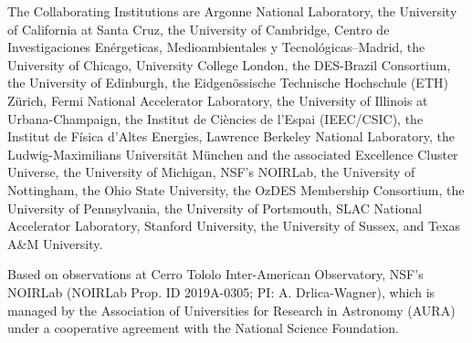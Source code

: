 \documentclass[twocolumn,trackchanges]{aastex63}
\begin{document}
The Collaborating Institutions are Argonne National Laboratory, the University of California at Santa Cruz, the University of Cambridge, Centro de Investigaciones Enérgeticas, Medioambientales y Tecnológicas–Madrid, the University of Chicago, University College London, the DES-Brazil Consortium, the University of Edinburgh, the Eidgenössische Technische Hochschule (ETH) Zürich, Fermi National Accelerator Laboratory, the University of Illinois at Urbana-Champaign, the Institut de Ciències de l’Espai (IEEC/CSIC), the Institut de Física d’Altes Energies, Lawrence Berkeley National Laboratory, the Ludwig-Maximilians Universität München and the associated Excellence Cluster Universe, the University of Michigan, NSF’s NOIRLab, the University of Nottingham, the Ohio State University, the OzDES Membership Consortium, the University of Pennsylvania, the University of Portsmouth, SLAC National Accelerator Laboratory, Stanford University, the University of Sussex, and Texas A\&M University.

Based on observations at Cerro Tololo Inter-American Observatory, NSF’s NOIRLab (NOIRLab Prop. ID 2019A-0305; PI: A. Drlica-Wagner), which is managed by the Association of Universities for Research in Astronomy (AURA) under a cooperative agreement with the National Science Foundation.





{}



\listofchanges
\end{document}
